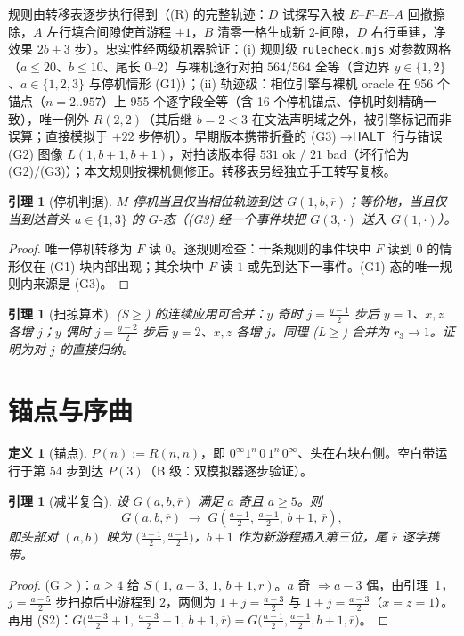 \documentclass[11pt]{ctexart}
\newtheorem{lemma}[theorem]{引理}
\theoremstyle{definition}
\newtheorem{definition}[theorem]{定义}
\newcommand{\HALT}{\textsf{HALT}}
\begin{document}
规则由转移表逐步执行得到（(R) 的完整轨迹：$D$ 试探写入被 $E$--$F$--$E$--$A$ 回撤擦除，$A$ 左行填合间隙使首游程 $+1$，$B$ 清零一格生成新 2-间隙，$D$ 右行重建，净效果 $2b+3$ 步）。忠实性经两级机器验证：(i) 规则级 \texttt{rulecheck.mjs} 对参数网格（$a\le20$、$b\le10$、尾长 $0$--$2$）与裸机逐行对拍 $564/564$ 全等（含边界 $y\in\{1,2\}$、$a\in\{1,2,3\}$ 与停机情形 (G1)）；(ii) 轨迹级：相位引擎与裸机 oracle 在 956 个锚点（$n=2..957$）上 955 个逐字段全等（含 16 个停机锚点、停机时刻精确一致），唯一例外 $R(2,2)$（其后继 $b=2<3$ 在文法声明域之外，被引擎标记而非误算；直接模拟于 $+22$ 步停机）。早期版本携带折叠的 (G3)$\to\HALT$ 行与错误 (G2) 图像 $L(1,b{+}1,b{+}1)$，对拍该版本得 $531$ ok / $21$ bad（坏行恰为 (G2)/(G3)）；本文规则按裸机侧修正。转移表另经独立手工转写复核。

\begin{lemma}[停机判据]\label{lem:halt}
$M$ 停机当且仅当相位轨迹到达 $G(1,b,\overline r)$；等价地，当且仅当到达首头 $a\in\{1,3\}$ 的 $G$-态（(G3) 经一个事件块把 $G(3,\cdot)$ 送入 $G(1,\cdot)$）。
\end{lemma}
\begin{proof}
唯一停机转移为 $F$ 读 $0$。逐规则检查：十条规则的事件块中 $F$ 读到 $0$ 的情形仅在 (G1) 块内部出现；其余块中 $F$ 读 $1$ 或先到达下一事件。(G1)-态的唯一规则内来源是 (G3)。
\end{proof}

\begin{lemma}[扫掠算术]\label{lem:sweep}
(S$\ge$) 的连续应用可合并：$y$ 奇时 $j=\frac{y-1}{2}$ 步后 $y=1$、$x,z$ 各增 $j$；$y$ 偶时 $j=\frac{y-2}{2}$ 步后 $y=2$、$x,z$ 各增 $j$。同理 (L$\ge$) 合并为 $r_3\to1$。证明为对 $j$ 的直接归纳。
\end{lemma}

\section{锚点与序曲}\label{sec:prologue}

\begin{definition}[锚点]\label{def:anchor}
$P(n):=R(n,n)$，即 $0^\infty 1^n\,0\,1^n\,0^\infty$、头在右块右侧。空白带运行于第 54 步到达 $P(3)$（B 级：双模拟器逐步验证）。
\end{definition}

\begin{lemma}[减半复合]\label{lem:half}
设 $G(a,b,\overline r)$ 满足 $a$ 奇且 $a\ge5$。则
\[
G(a,b,\overline r)\;\longrightarrow\;G\!\left(\tfrac{a-1}{2},\,\tfrac{a-1}{2},\,b{+}1,\,\overline r\right),
\]
即头部对 $(a,b)$ 映为 $\bigl(\frac{a-1}{2},\frac{a-1}{2}\bigr)$，$b{+}1$ 作为新游程插入第三位，尾 $\overline r$ 逐字携带。
\end{lemma}
\begin{proof}
(G$\ge$)：$a\ge4$ 给 $S(1,\,a{-}3,\,1,\,b{+}1,\overline r)$。$a$ 奇 $\Rightarrow a{-}3$ 偶，由引理~\ref{lem:sweep}，$j=\frac{a-5}{2}$ 步扫掠后中游程到 $2$，两侧为 $1+j=\frac{a-3}{2}$ 与 $1+j=\frac{a-3}{2}$（$x=z=1$）。再用 (S2)：$G\bigl(\frac{a-3}{2}{+}1,\,\frac{a-3}{2}{+}1,\,b{+}1,\overline r\bigr)=G\bigl(\frac{a-1}{2},\frac{a-1}{2},b{+}1,\overline r\bigr)$。
\end{proof}
\end{document}
